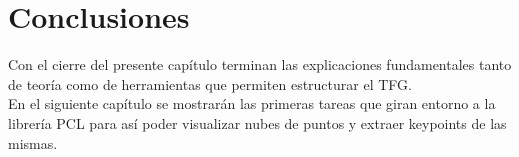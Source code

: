 \section{Conclusiones}
Con el cierre del presente capítulo terminan las explicaciones fundamentales tanto de teoría como de herramientas que permiten estructurar el TFG.
\\
En el siguiente capítulo se mostrarán las primeras tareas que giran entorno a la librería PCL para así poder visualizar nubes de puntos y extraer keypoints de las mismas.

